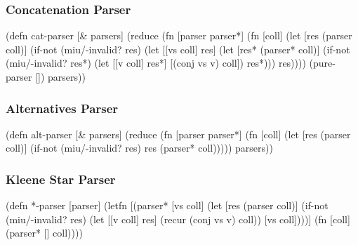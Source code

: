 \documentclass{beamer}
\begin{document}

\begin{frame}[fragile]
\frametitle{Concatenation Parser}

\begin{semiverbatim}
(defn cat-parser [& parsers]
  (reduce (fn [parser parser*]
            (fn [coll]
              (let [res (parser coll)]
                (if-not (miu/-invalid? res)
                  (let [[vs coll] res]
                    (let [res* (parser* coll)]
                      (if-not (miu/-invalid? res*)
                        (let [[v coll] res*]
                          [(conj vs v) coll])
                        res*)))
                  res))))
          (pure-parser []) parsers))
\end{semiverbatim}

\end{frame}


\begin{frame}[fragile]
\frametitle{Alternatives Parser}

\begin{semiverbatim}
(defn alt-parser [& parsers]
  (reduce (fn [parser parser*]
            (fn [coll]
              (let [res (parser coll)]
                (if-not (miu/-invalid? res)
                  res
                  (parser* coll)))))
          parsers))
\end{semiverbatim}

\end{frame}


\begin{frame}[fragile]
\frametitle{Kleene Star Parser}

\begin{semiverbatim}
(defn *-parser [parser]
  (letfn [(parser* [vs coll]
            (let [res (parser coll)]
              (if-not (miu/-invalid? res)
                (let [[v coll] res]
                  (recur (conj vs v) coll))
                [vs coll])))]
    (fn [coll] (parser* [] coll))))
\end{semiverbatim}

\end{frame}

\end{document}
